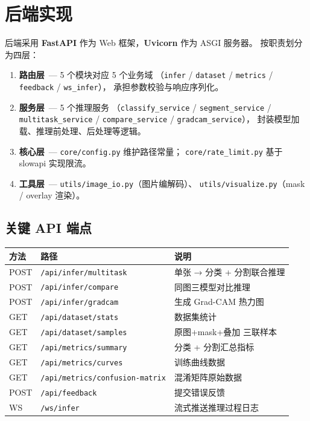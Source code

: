 \documentclass[12pt, a4paper, openany]{ctexbook}
\begin{document}
\section{后端实现}

后端采用 \textbf{FastAPI} 作为 Web 框架，\textbf{Uvicorn} 作为 ASGI 服务器。
按职责划分为四层：

\begin{enumerate}[leftmargin=*]
  \item \textbf{路由层}\ — 5 个模块对应 5 个业务域
        （\texttt{infer} / \texttt{dataset} / \texttt{metrics} / \texttt{feedback} / \texttt{ws\_infer}），
        承担参数校验与响应序列化。
  \item \textbf{服务层}\ — 5 个推理服务
        （\texttt{classify\_service} / \texttt{segment\_service} / \texttt{multitask\_service} /
        \texttt{compare\_service} / \texttt{gradcam\_service}），
        封装模型加载、推理前处理、后处理等逻辑。
  \item \textbf{核心层}\ — \texttt{core/config.py} 维护路径常量；
        \texttt{core/rate\_limit.py} 基于 slowapi 实现限流。
  \item \textbf{工具层}\ — \texttt{utils/image\_io.py}（图片编解码）、
        \texttt{utils/visualize.py}（mask / overlay 渲染）。
\end{enumerate}

\subsection{关键 API 端点}

\begin{center}
\footnotesize
\begin{tabular}{llL{5.5cm}}
  \toprule
  \textbf{方法} & \textbf{路径} & \textbf{说明} \\
  \midrule
  POST & \texttt{/api/infer/multitask}  & 单张 → 分类 + 分割联合推理 \\
  POST & \texttt{/api/infer/compare}    & 同图三模型对比推理 \\
  POST & \texttt{/api/infer/gradcam}    & 生成 Grad-CAM 热力图 \\
  GET  & \texttt{/api/dataset/stats}    & 数据集统计 \\
  GET  & \texttt{/api/dataset/samples}  & 原图+mask+叠加 三联样本 \\
  GET  & \texttt{/api/metrics/summary}  & 分类 + 分割汇总指标 \\
  GET  & \texttt{/api/metrics/curves}   & 训练曲线数据 \\
  GET  & \texttt{/api/metrics/confusion-matrix} & 混淆矩阵原始数据 \\
  POST & \texttt{/api/feedback}         & 提交错误反馈 \\
  WS   & \texttt{/ws/infer}             & 流式推送推理过程日志 \\
  \bottomrule
\end{tabular}
\end{center}
\end{document}
